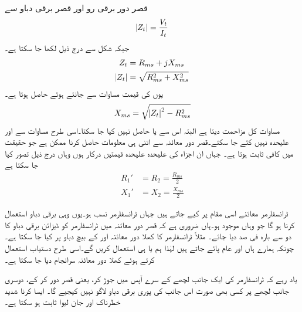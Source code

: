 قصر دور برقی رو اور قصر برقی دباو سے 
\begin{align*}
\abs{Z_t}=\frac{V_t}{I_t}
\end{align*}
جبکہ  شکل  سے  درج ذیل لکھا جا سکتا ہے۔
\begin{align*}
Z_t&=R_{ms}+j X_{ms}\\
\abs{Z_t}&=\sqrt{R_{ms}^2+X_{ms}^2}
\end{align*}
یوں  کی قیمت مساوات  سے  جانتے ہوئے  حاصل ہوتا ہے۔
\begin{align}\label{مساوات_ٹرانسفارمر_کسر_دور_امالہ_حاصل}
X_{ms}=\sqrt{\abs{Z_t}^2-R_{ms}^2}
\end{align}
مساوات  کل مزاحمت دیتا ہے البتہ اس سے  یا  حاصل نہیں کیا جا سکتا۔اسی طرح مساوات  سے  اور  علیحدہ نہیں کئے جا سکتے۔قصر دور معائنہ سے اتنی ہی معلومات حاصل کرنا ممکن ہے جو حقیقت  میں کافی ثابت ہوتا ہے۔ جہاں ان اجزاء کی علیحدہ علیحدہ قیمتیں درکار ہوں وہاں درج ذیل تصور کیا جا سکتا ہے
\begin{align*}
R_1'&=R_2=\frac{R_{ms}}{2}\\
X_1'&=X_2=\frac{X_{ms}}{2}
\end{align*}


ٹرانسفارمر معائنے  اسی مقام پر کیے جاتے ہیں جہاں ٹرانسفارمر نسب ہو۔یوں وہی  برقی دباو استعمال کرنا ہو گا جو وہاں موجود ہو۔ہاں  ضروری ہے کہ  قصر دور معائنہ میں  ٹرانسفارمر کو  ڈیزائن  برقی دباو کا دو سے بارہ  فی صد دیا جائے۔ مثلاً   ٹرانسفارمر کا کھلا دور معائنہ   اور   کے بیچ  دباو پر کیا جا سکتا ہے۔ چونکہ ہمارے ہاں   اور   عام پائے جاتے ہیں لہٰذا ہم   یا   ہی استعمال کریں گے۔اسی طرح دستیاب  استعمال کرتے ہوئے کھلا دور معائنہ سرانجام دیا جا سکتا ہے۔

یاد رہے کہ ٹرانسفارمر کی ایک جانب لچھے کے سرے آپس میں جوڑ کر، یعنی  قصر دور کر کے، دوسری جانب لچھے پر کسی بھی صورت اس جانب کی پوری برقی دباو لاگو نہیں کیجیے گا۔ ایسا کرنا  شدید  خطرناک اور جان لیوا ثابت ہو سکتا ہے۔

